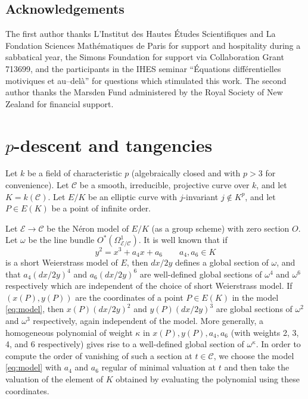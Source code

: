 \documentclass[12pt,reqno]{amsart}
\numberwithin{equation}{section}
\theoremstyle{plain}
\theoremstyle{definition}
\theoremstyle{remark}
\newcommand{\CC}{\mathcal{C}}
\newcommand{\EE}{\mathcal{E}}
\newcommand{\<}{\langle}
\renewcommand{\>}{\rangle}
\numberwithin{equation}{section}
\begin{document}
\subsection{Acknowledgements}
The first author thanks L'Institut des Hautes \'Etudes Scientifiques
and La Fondation Sciences Math\'ematiques de Paris for support and
hospitality during a sabbatical year, the Simons Foundation for
support via Collaboration Grant 713699, and the participants in the
IHES seminar ``Équations diff\'erentielles motiviques et au–del\`a'' for
questions which stimulated this work.  The second author thanks the
Marsden Fund administered by the Royal Society of New Zealand for
financial support.




\section{$p$-descent and tangencies}\label{s:p-descent}
Let $k$ be a field of characteristic $p$ (algebraically closed and
with $p>3$ for convenience).  Let $\CC$ be a smooth, irreducible,
projective curve over $k$, and let $K=k(\CC)$. Let $E/K$ be an
elliptic curve with $j$-invariant $j\not\in K^p$,
and let $P\in E(K)$ be a point of infinite order.

Let $\EE\to\CC$ be the N\'eron model of $E/K$ (as a group scheme) with
zero section $O$.  Let $\omega$ be the line bundle
$O^*\left(\Omega^1_{\EE/\CC}\right)$.  It is well known that if
\begin{equation}\label{eq:model}
 y^2=x^3+a_4x+a_6\qquad a_4,a_6\in K 
\end{equation}
is a short Weierstrass model of $E$, then $dx/2y$ defines a global
section of $\omega$, and that $a_4(dx/2y)^4$ and $a_6(dx/2y)^6$ are
well-defined global sections of $\omega^4$ and $\omega^6$ respectively
which are independent of the choice of short Weierstrass model.  If
$(x(P),y(P))$ are the coordinates of a point $P\in E(K)$ in the model
\eqref{eq:model}, then $x(P)(dx/2y)^2$ and $y(P)(dx/2y)^3$ are global
sections of $\omega^2$ and $\omega^3$ respectively, again independent
of the model.  More generally, a homogeneous polynomial of weight
$\kappa$ in $x(P),y(P),a_4,a_6$ (with weights 2, 3, 4, and 6
respectively) gives rise to a well-defined global section of
$\omega^\kappa$.  In order to compute the order of vanishing of such a
section at $t\in\CC$, we choose the model \eqref{eq:model} with $a_4$
and $a_6$ regular of minimal valuation at $t$ and then take the
valuation of the element of $K$ obtained by evaluating the polynomial
using these coordinates.
\end{document}
